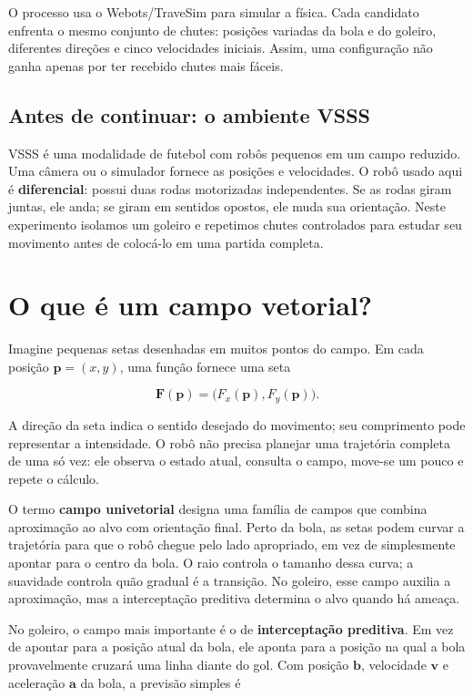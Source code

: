 \documentclass[11pt,a4paper]{article}
\newcommand{\termo}[1]{\textbf{\color{azulescuro}#1}}
\begin{document}
O processo usa o Webots/TraveSim para simular a física. Cada candidato enfrenta
o mesmo conjunto de chutes: posições variadas da bola e do goleiro, diferentes
direções e cinco velocidades iniciais. Assim, uma configuração não ganha apenas
por ter recebido chutes mais fáceis.

\subsection*{Antes de continuar: o ambiente VSSS}

VSSS é uma modalidade de futebol com robôs pequenos em um campo reduzido. Uma
câmera ou o simulador fornece as posições e velocidades. O robô usado aqui é
\termo{diferencial}: possui duas rodas motorizadas independentes. Se as rodas
giram juntas, ele anda; se giram em sentidos opostos, ele muda sua orientação.
Neste experimento isolamos um goleiro e repetimos chutes controlados para estudar
seu movimento antes de colocá-lo em uma partida completa.

\section{O que é um campo vetorial?}

Imagine pequenas setas desenhadas em muitos pontos do campo. Em cada posição
$\mathbf{p}=(x,y)$, uma função fornece uma seta

\[
  \mathbf{F}(\mathbf{p}) = \bigl(F_x(\mathbf{p}),F_y(\mathbf{p})\bigr).
\]

A direção da seta indica o sentido desejado do movimento; seu comprimento pode
representar a intensidade. O robô não precisa planejar uma trajetória completa
de uma só vez: ele observa o estado atual, consulta o campo, move-se um pouco e
repete o cálculo.

O termo \termo{campo univetorial} designa uma família de campos que combina
aproximação ao alvo com orientação final. Perto da bola, as setas podem curvar a
trajetória para que o robô chegue pelo lado apropriado, em vez de simplesmente
apontar para o centro da bola. O raio controla o tamanho dessa curva; a
suavidade controla quão gradual é a transição. No goleiro, esse campo auxilia a
aproximação, mas a interceptação preditiva determina o alvo quando há ameaça.

No goleiro, o campo mais importante é o de \termo{interceptação preditiva}. Em
vez de apontar para a posição atual da bola, ele aponta para a posição na qual a
bola provavelmente cruzará uma linha diante do gol. Com posição $\mathbf{b}$,
velocidade $\mathbf{v}$ e aceleração $\mathbf{a}$ da bola, a previsão simples é
\end{document}
